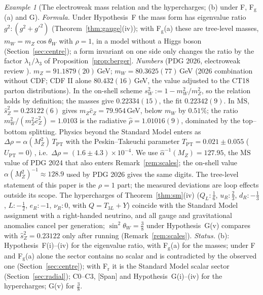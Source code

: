 \documentclass[aps,pra,onecolumn,superscriptaddress,nofootinbib,10pt]{revtex4-2}
\theoremstyle{definition}
\theoremstyle{remark}
\newtheorem{example}[theorem]{Example}
\begin{document}
\begin{example}[The electroweak mass relation and the hypercharges; (b) under F, F$_{\mathrm g}$(a) and G]\label{ex:ew}
\emph{Formula.}  Under Hypothesis~F the mass form has eigenvalue ratio $g^2:(g^2+g'^2)$ (Theorem~\ref{thm:gauge}(iv));
with F$_{\mathrm g}$(a) these are tree-level masses, $m_W=m_Z\cos\theta_W$ with $\rho=1$, in a model without a Higgs
boson (Section~\ref{sec:centre}); a form invariant on one side only
changes the ratio by the factor $\lambda_1/\lambda_3$ of Proposition~\ref{prop:berger}.
\emph{Numbers} (PDG 2026, electroweak review \cite{ex-PDG26}).  $m_Z=91.1879(20)$\,GeV;
$m_W=80.3625(77)$\,GeV (2026 combination without CDF; CDF II alone $80.432(16)$\,GeV, the value adjusted to the
CT18 parton distributions).  In the on-shell scheme $s_W^2:=1-m_W^2/m_Z^2$, so the relation holds by
definition; the masses give $0.22334(15)$, the fit $0.22342(9)$.  In $\overline{\mathrm{MS}}$, $\hat s_Z^2=0.23122(6)$
gives $m_Z\hat c_Z=79.954$\,GeV, below $m_W$ by $0.51\%$; the ratio $m_W^2/(m_Z^2\hat c_Z^2)=1.0103$ is the
radiative $\hat\rho=1.01016(9)$, dominated by the top--bottom splitting.  Physics beyond the Standard Model
enters as $\Delta\rho=\alpha(M_Z^2)\,T_{\mathrm{PT}}$ with the Peskin--Takeuchi parameter $T_{\mathrm{PT}}=0.021\pm0.055$
($U_{\mathrm{PT}}=0$) \cite{ex-PDG26}, i.e.\ $\Delta\rho=(1.6\pm4.3)\times10^{-4}$.  We use $\hat\alpha^{-1}(M_Z)=127.95$, the
$\overline{\mathrm{MS}}$ value of PDG 2024 \cite{PDG} that also enters Remark~\ref{rem:scales}; the on-shell value
$\alpha(M_Z^2)^{-1}\approx128.9$ \cite{ex-Steinhauser98} used by PDG 2026 gives the same digits.  The tree-level
statement of this paper is the $\rho=1$ part; the measured deviations are loop effects outside its scope.
The hypercharges of Theorem~\ref{thm:sm}(iv) ($Q_L:\tfrac16$, $u_R:\tfrac23$, $d_R:-\tfrac13$, $L:-\tfrac12$, $e_R:-1$,
$\nu_R:0$, with $Q=T_{3L}+Y$) coincide with the Standard Model assignment with a right-handed neutrino, and
all gauge and gravitational anomalies cancel per generation; $\sin^2\theta_W=\tfrac38$ under
Hypothesis~G(v) compares with $\hat s_Z^2=0.23122$ only after running (Remark~\ref{rem:scales}).
\emph{Status.}  (b): Hypothesis~F(i)--(iv) for the eigenvalue ratio, with F$_{\mathrm g}$(a) for the masses; under F and F$_{\mathrm g}$(a) alone the sector contains no scalar and is contradicted by the observed one (Section~\ref{sec:centre}); with F$_{\mathrm r}$ it is the Standard Model scalar sector (Section~\ref{sec:radial}); C0--C3, [Span] and Hypothesis~G(i)--(iv)
for the hypercharges; G(v) for $\tfrac38$.
\end{example}
\end{document}
